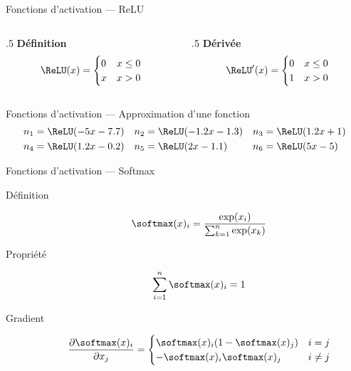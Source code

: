 \begin{frame}{Fonctions d'activation --- ReLU}
  \begin{center}
  \end{center}

  \begin{columns}
    \begin{column}{.5\tw}
      \centering
      \textbf{Définition}
      \[
        \ReLU(x) = \begin{cases}
                     0 & x \leq 0 \\
                     x & x > 0 \\
                   \end{cases}
      \]
      \end{column}
    \begin{column}{{.5\tw}}
      \centering
      \textbf{Dérivée}
      \[
        \ReLU'(x) =  \begin{cases}
                       0 & x \leq 0 \\
                       1 & x > 0\\
                     \end{cases}
      \]
    \end{column}
  \end{columns}
\end{frame}

\begin{frame}{Fonctions d'activation --- Approximation d'une fonction}
  \centering
  {\small
    \begin{align*}
      n_1 & = \ReLU(-5x - 7.7) & n_2 & = \ReLU(-1.2x - 1.3) & n_3 & = \ReLU(1.2x + 1) \\
      n_4 & = \ReLU(1.2x - 0.2) & n_5 & = \ReLU(2x - 1.1) & n_6 & = \ReLU(5x - 5) \\
    \end{align*}
  }
\end{frame}

\begin{frame}{Fonctions d'activation --- Softmax}
  \begin{description}
    \item[Définition] \[\softmax(x)_i = \frac{\exp(x_i)}{\sum_{k = 1}^n{\exp(x_k)}}\]
    \item[Propriété] \[\sum_{i = 1}^n{\softmax(x)_i} = 1\]
    \item[Gradient] \[
      \frac{\partial \softmax(x)_i}{\partial x_j} =
        \begin{cases}
          \softmax(x)_i(1 - \softmax(x)_j) & i = j \\
          -\softmax(x)_i\softmax(x)_j & i \neq j
        \end{cases}
      \]
  \end{description}
  
\end{frame}
